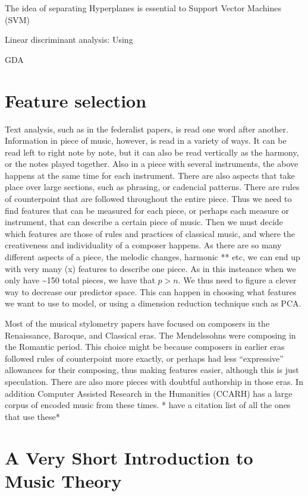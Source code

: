 \documentclass[12pt,twoside]{reedthesis}
\theoremstyle{definition}
\theoremstyle{definition}
\theoremstyle{definition}
\theoremstyle{remark}
\begin{document}
The idea of separating Hyperplanes is essential to Support Vector
Machines (SVM)

Linear discriminant analysis: Using

GDA

\section{Feature selection}\label{feature-selection}

Text analysis, such as in the federalist papers, is read one word after
another. Information in piece of music, however, is read in a variety of
ways. It can be read left to right note by note, but it can also be read
vertically as the harmony, or the notes played together. Also in a piece
with several instruments, the above happens at the same time for each
instrument. There are also aspects that take place over large sections,
such as phrasing, or cadencial patterns. There are rules of counterpoint
that are followed throughout the entire piece. Thus we need to find
features that can be measured for each piece, or perhaps each measure or
instrument, that can describe a certain piece of music. Then we must
decide which features are those of rules and practices of classical
music, and where the creativeness and individuality of a composer
happens. As there are so many different aspects of a piece, the melodic
changes, harmonic ** etc, we can end up with very many (x) features to
describe one piece. As in this insteance when we only have
\textasciitilde{}150 total pieces, we have that \(p > n\). We thus need
to figure a clever way to decrease our predictor space. This can happen
in choosing what features we want to use to model, or using a dimension
reduction technique such as PCA.

Most of the musical stylometry papers have focused on composers in the
Renaissance, Baroque, and Classical eras. The Mendelssohns were
composing in the Romantic period. This choice might be because composers
in earlier eras followed rules of counterpoint more exactly, or perhaps
had less ``expressive'' allowances for their composing, thus making
features easier, although this is just speculation. There are also more
pieces with doubtful authorship in those eras. In addition Computer
Assisted Research in the Humanities (CCARH) has a large corpus of
encoded music from these times. * have a citation list of all the ones
that use these*

\section{A Very Short Introduction to Music
Theory}\label{a-very-short-introduction-to-music-theory}
\end{document}
